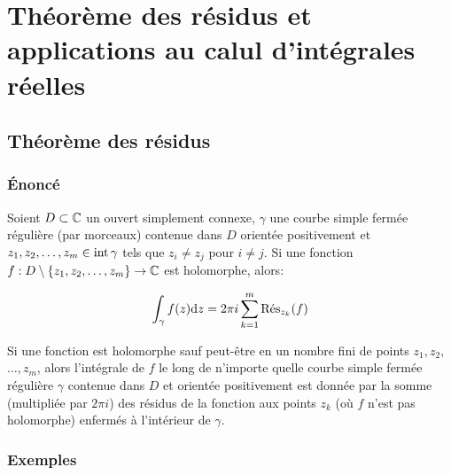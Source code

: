 \chapter{Théorème des résidus et applications au calul d'intégrales réelles}


\section{Théorème des résidus}

\subsection{Énoncé}

\begin{theorem}
    Soient $D \subset \Cx$ un ouvert simplement connexe, $\gamma$ une courbe simple fermée régulière (par morceaux) contenue dans $D$ orientée positivement et $z_1, z_2, \ldots, z_m \in \inte \gamma$ tels que $z_i \neq z_j$ pour $i \neq j$.
    Si une fonction $f: D\setminus \{z_1, z_2, \ldots, z_m\} \rightarrow \Cx$ est holomorphe, alors:
    
    \[ \int_\gamma f(z) \dz = 2\pi i \sum_{k = 1}^m \Res_{z_k}(f) \]
\end{theorem}

\begin{note}
    Si une fonction est holomorphe sauf peut-être en un nombre fini de points $z_1, z_2,$ $ \ldots, z_m$, alors l'intégrale de $f$ le long de n'importe quelle courbe simple fermée régulière $\gamma$ contenue dans $D$ et orientée positivement est donnée par la somme (multipliée par $2\pi i$) des résidus de la fonction aux points $z_k$ (où $f$ n'est pas holomorphe) enfermés à l'intérieur de $\gamma$.
\end{note}

\subsection{Exemples}

